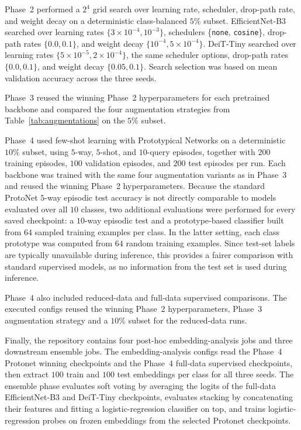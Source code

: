 \documentclass[12pt,a4paper]{article}
\begin{document}
Phase~2 performed a $2^4$ grid search over learning rate, scheduler, drop-path rate, and weight decay on a deterministic class-balanced $5\%$ subset. EfficientNet-B3 searched over learning rates $\{3 \times 10^{-4}, 10^{-3}\}$, schedulers \{\texttt{none}, \texttt{cosine}\}, drop-path rates $\{0.0, 0.1\}$, and weight decay $\{10^{-4}, 5 \times 10^{-4}\}$. DeiT-Tiny searched over learning rates $\{5 \times 10^{-5}, 2 \times 10^{-4}\}$, the same scheduler options, drop-path rates $\{0.0, 0.1\}$, and weight decay $\{0.05, 0.1\}$. Search selection was based on mean validation accuracy across the three seeds.

Phase~3 reused the winning Phase~2 hyperparameters for each pretrained backbone and compared the four augmentation strategies from Table~\ref{tab:augmentations} on the $5\%$ subset.

Phase~4 used few-shot learning with Prototypical Networks on a deterministic $10\%$ subset, using $5$-way, $5$-shot, and $10$-query episodes, together with $200$ training episodes, $100$ validation episodes, and $200$ test episodes per run. Each backbone was trained with the same four augmentation variants as in Phase~3 and reused the winning Phase~2 hyperparameters. Because the standard ProtoNet $5$-way episodic test accuracy is not directly comparable to models evaluated over all $10$ classes, two additional evaluations were performed for every saved checkpoint: a $10$-way episodic test and a prototype-based classifier built from $64$ sampled training examples per class. In the latter setting, each class prototype was computed from $64$ random training examples. Since test-set labels are typically unavailable during inference, this provides a fairer comparison with standard supervised models, as no information from the test set is used during inference.

Phase~4 also included reduced-data and full-data supervised comparisons. The executed configs reused the winning Phase~2 hyperparameters, Phase~3 augmentation strategy and a $10\%$ subset for the reduced-data runs.

Finally, the repository contains four post-hoc embedding-analysis jobs and three downstream ensemble jobs. The embedding-analysis configs read the Phase~4 Protonet winning checkpoints and the Phase~4 full-data supervised checkpoints, then extract $100$ train and $100$ test embeddings per class for all three seeds. The ensemble phase evaluates soft voting by averaging the logits of the full-data EfficientNet-B3 and DeiT-Tiny checkpoints, evaluates stacking by concatenating their features and fitting a logistic-regression classifier on top, and trains logistic-regression probes on frozen embeddings from the selected Protonet checkpoints.
\end{document}
